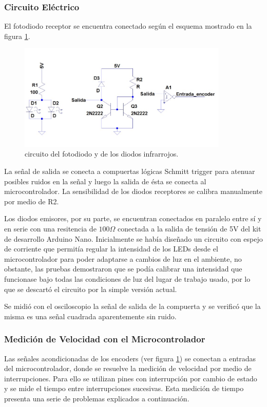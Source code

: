 \documentclass[10pt,conference,a4paper,onecolumn]{article}%
\begin{document}
\subsubsection{Circuito Eléctrico}
El fotodiodo receptor se encuentra conectado según el esquema mostrado en la figura \ref{fig:circuitoFotodiodo}.
\begin{figure}[h]
\centering
\includegraphics[width=10cm]{./imagenes/circuitoFotodiodo.jpeg}
\caption{circuito del fotodiodo y de los diodos infrarrojos.}
\label{fig:circuitoFotodiodo}
\end{figure}
La señal de salida se conecta a compuertas lógicas Schmitt trigger para atenuar posibles ruidos en la señal y luego la salida de ésta se conecta al microcontrolador. La sensibilidad de los diodos receptores se calibra manualmente por medio de R2.

Los diodos emisores, por su parte, se encuentran conectados en paralelo entre sí y en serie con una resitencia de $100 \Omega$ conectada a la salida de tensión de 5V del kit de desarrollo Arduino Nano. Inicialmente se había diseñado un circuito con espejo de corriente que permitía regular la intensidad de los LEDs desde el microcontrolador para poder adaptarse a cambios de luz en el ambiente, no obstante, las pruebas demostraron que se podía calibrar una intensidad que funcionase bajo todas las condiciones de luz del lugar de trabajo usado, por lo que se descartó el circuito por la simple versión actual.

Se midió con el osciloscopio la señal de salida de la compuerta y se verificó que la misma es una señal cuadrada aparentemente sin ruido.

\subsubsection{Medición de Velocidad con el Microcontrolador}
Las señales acondicionadas de los encoders (ver figura \ref{fig:circuitoFotodiodo}) se conectan a entradas del microcontrolador, donde se resuelve la medición de velocidad por medio de interrupciones. Para ello se utilizan pines con interrupción
por cambio de estado y se mide el tiempo entre interrupciones sucesivas. Esta medición de tiempo presenta una serie de problemas explicados a continuación.
\end{document}
